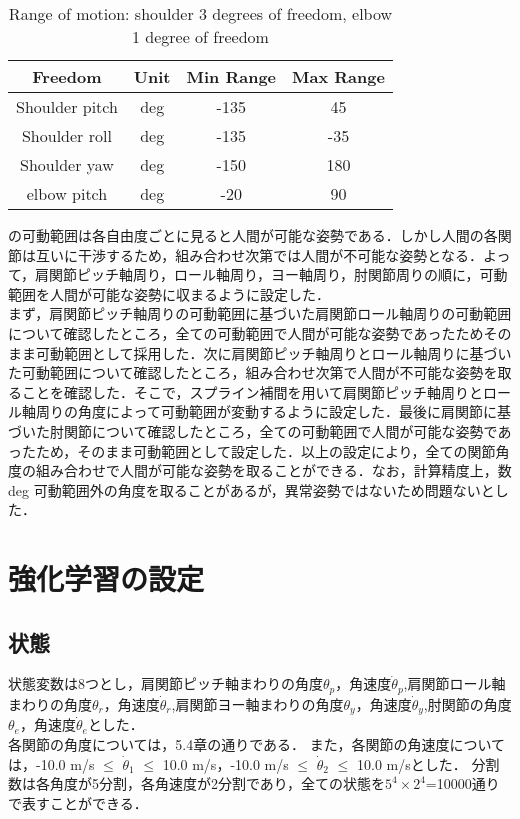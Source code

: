 
\begin{table}[tb]
  \begin{center}
    \caption{Range of motion: shoulder 3 degrees of freedom, elbow 1 degree of freedom}

    \begin{tabular}{c|c|c|c}
      \hline
      Freedom & Unit & Min Range & Max Range \\
      \hline
      Shoulder pitch & deg & -135 & 45 \\
      Shoulder roll & deg & -135 & -35 \\
      Shoulder yaw & deg & -150 & 180 \\
      elbow pitch & deg & -20 & 90 \\
      \hline
    \end{tabular}
  \end{center}
\end{table}

の可動範囲は各自由度ごとに見ると人間が可能な姿勢である．しかし人間の各関節は互いに干渉するため，組み合わせ次第では人間が不可能な姿勢となる．よって，肩関節ピッチ軸周り，ロール軸周り，ヨー軸周り，肘関節周りの順に，可動範囲を人間が可能な姿勢に収まるように設定した．\\
まず，肩関節ピッチ軸周りの可動範囲に基づいた肩関節ロール軸周りの可動範囲について確認したところ，全ての可動範囲で人間が可能な姿勢であったためそのまま可動範囲として採用した．次に肩関節ピッチ軸周りとロール軸周りに基づいた可動範囲について確認したところ，組み合わせ次第で人間が不可能な姿勢を取ることを確認した．そこで，スプライン補間\cite{spline}を用いて肩関節ピッチ軸周りとロール軸周りの角度によって可動範囲が変動するように設定した．最後に肩関節に基づいた肘関節について確認したところ，全ての可動範囲で人間が可能な姿勢であったため，そのまま可動範囲として設定した．以上の設定により，全ての関節角度の組み合わせで人間が可能な姿勢を取ることができる．なお，計算精度上，数 deg 可動範囲外の角度を取ることがあるが，異常姿勢ではないため問題ないとした．


\section{強化学習の設定}
\subsection{状態}
状態変数は8つとし，肩関節ピッチ軸まわりの角度$\theta_{p}$，角速度$\dot{\theta}_{p}$,肩関節ロール軸まわりの角度$\theta_{r}$，角速度$\dot{\theta}_{r}$,肩関節ヨー軸まわりの角度$\theta_{y}$，角速度$\dot{\theta}_{y}$,肘関節の角度$\theta_{e}$，角速度$\dot{\theta}_{e}$とした．\\
各関節の角度については，5.4章の通りである．
また，各関節の角速度については，-10.0 m/s $\le$ $\dot{\theta}_{1}$ $\le$ 10.0 m/s，-10.0 m/s $\le$ $\dot{\theta}_{2}$ $\le$ 10.0 m/sとした．
分割数は各角度が5分割，各角速度が2分割であり，全ての状態を$5^{4}\times 2^{4}$=10000通りで表すことができる．
